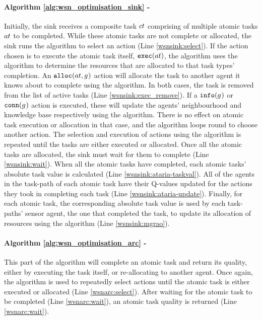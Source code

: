 \paragraph{Algorithm \ref{alg:wsn_optimisation_sink} - \acronymWSNOptimisationSink{}{}}
Initially, the sink receives a composite task $\varCompositeTask{}{}$ comprising of multiple atomic tasks $\varAtomicTask{}{}$ to be completed. While these atomic tasks are not complete or allocated, the sink runs the \acronymATARIA{}{} algorithm to select an action (Line \ref{wsnsink:select}).  If the action chosen is to execute the atomic task itself, $\functionExec{}{}$, the algorithm uses the \acronymMGRAO{}{} algorithm to determine the resources that are allocated to that task types' completion. An $\functionAlloc{}{}$ action will allocate the task to another agent it knows about to complete using the \acronymWSNOptimisationArc{}{} algorithm. In both cases, the task is removed from the list of active tasks  (Line \ref{wsnsink:exec_remove}). If a $\functionInfo{}{}$ or $\functionLink{}{}$ action is executed, these will update the agents' neighbourhood and knowledge base respectively using the \acronymATARIA{}{} algorithm. There is no effect on atomic task execution or allocation in that case, and the algorithm loops round to choose another action. The selection and execution of actions using the \acronymATARIA{}{} algorithm is repeated until the tasks are either executed or allocated. Once all the atomic tasks are allocated, the sink must wait for them to complete (Line \ref{wsnsink:wait}). When all the atomic tasks have completed, each atomic tasks' absolute task value is calculated (Line \ref{wsnsink:ataria-taskval}). All of the agents in the task-path of each atomic task have their Q-values updated for the actions they took in completing each task (Line \ref{wsnsink:ataria-update}). Finally, for each atomic task, the corresponding absolute task value is used by each task-paths' sensor agent, the one that completed the task, to update its allocation of resources using the \acronymMGRAO{}{} algorithm (Line \ref{wsnsink:mgrao}).
\paragraph*{Algorithm \ref{alg:wsn_optimisation_arc} - \acronymWSNOptimisationArc{}{} }
This part of the algorithm will complete an atomic task and return its quality, either by executing the task itself, or re-allocating to another agent.  Once again,  the \acronymATARIA{}{} algorithm is used to repeatedly select actions until the atomic task is either executed or allocated (Line \ref{wsnarc:select}). After waiting for the atomic task to be completed (Line \ref{wsnarc:wait}),  an atomic task quality is returned (Line \ref{wsnarc:wait}).

